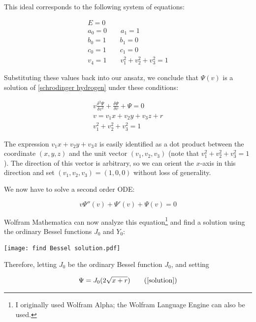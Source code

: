 \documentclass{article}
\begin{document}
This ideal corresponds to the following system of equations:

\begin{equation}
\begin{gathered}
E = 0 \\
a_0 = 0 \qquad
a_1 = 1 \\
b_0 = 1 \qquad
b_1 = 0 \\
c_0 = 1 \qquad
c_1 = 0 \\
v_4 = 1 \qquad
v_1^2 + v_2^2 + v_3^2 = 1
\end{gathered}
\end{equation}

Substituting these values back into our ansatz, we conclude that $\Psi(v)$
is a solution of \eqref{schrodinger hydrogen} under these conditions:

\begin{equation}
\label{related solution}
\begin{gathered}
v \frac{\delta^2\Psi}{\delta v^2} + \frac{\delta\Psi}{\delta v} + \Psi = 0 \\
v = v_1 x+ v_2 y+ v_3 z+r \\
v_1^2 + v_2^2 + v_3^2 = 1
\end{gathered}
\end{equation}

The expression $v_1 x + v_2 y + v_3 z$ is easily identified as a dot product between
the coordinate $(x,y,z)$ and the unit vector $(v_1, v_2, v_3)$ (note
that $v_1^2 + v_2^2 + v_3^2 = 1$).  The direction of this vector is arbitrary,
so we can orient the $x$-axis in this direction and set $(v_1, v_2, v_3) = (1,0,0)$
without loss of generality.

We now have to solve a second order ODE:

\begin{equation}
v \Psi''(v) + \Psi'(v) + \Psi(v) = 0
\end{equation}

Wolfram Mathematica\cite{Mathematica} can now
analyze this equation\footnote{I originally used Wolfram Alpha; the Wolfram Language Engine can also be used.}
and find a solution using the ordinary Bessel functions $J_0$ and $Y_0$:

\texttt{[image: find Bessel solution.pdf]}

Therefore, letting $J_0$ be the ordinary Bessel function $J_0$, and setting

\begin{equation}
\Psi = J_0(2\sqrt{x+r})
\tag{\ref{solution}}
\end{equation}
\end{document}
